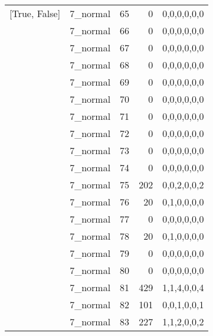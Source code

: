 \begin{tabular}{llrrl}
 [True, False]   & 7\_normal            &            65 &                     0 & 0,0,0,0,0,0   \\
 [True, False]   & 7\_normal            &            66 &                     0 & 0,0,0,0,0,0   \\
 [True, False]   & 7\_normal            &            67 &                     0 & 0,0,0,0,0,0   \\
 [True, False]   & 7\_normal            &            68 &                     0 & 0,0,0,0,0,0   \\
 [True, False]   & 7\_normal            &            69 &                     0 & 0,0,0,0,0,0   \\
 [True, False]   & 7\_normal            &            70 &                     0 & 0,0,0,0,0,0   \\
 [True, False]   & 7\_normal            &            71 &                     0 & 0,0,0,0,0,0   \\
 [True, False]   & 7\_normal            &            72 &                     0 & 0,0,0,0,0,0   \\
 [True, False]   & 7\_normal            &            73 &                     0 & 0,0,0,0,0,0   \\
 [True, False]   & 7\_normal            &            74 &                     0 & 0,0,0,0,0,0   \\
 [True, False]   & 7\_normal            &            75 &                   202 & 0,0,2,0,0,2   \\
 [True, False]   & 7\_normal            &            76 &                    20 & 0,1,0,0,0,0   \\
 [True, False]   & 7\_normal            &            77 &                     0 & 0,0,0,0,0,0   \\
 [True, False]   & 7\_normal            &            78 &                    20 & 0,1,0,0,0,0   \\
 [True, False]   & 7\_normal            &            79 &                     0 & 0,0,0,0,0,0   \\
 [True, False]   & 7\_normal            &            80 &                     0 & 0,0,0,0,0,0   \\
 [True, False]   & 7\_normal            &            81 &                   429 & 1,1,4,0,0,4   \\
 [True, False]   & 7\_normal            &            82 &                   101 & 0,0,1,0,0,1   \\
 [True, False]   & 7\_normal            &            83 &                   227 & 1,1,2,0,0,2   \\

\end{tabular}
